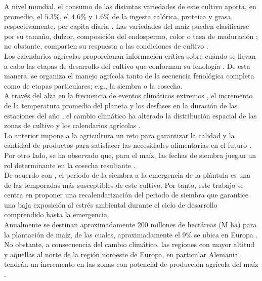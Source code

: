 A nivel mundial, el consumo de las distintas variedades de este cultivo aporta, en promedio, el $5.3\%$, el $4.6\%$ y $1.6\%$ de la ingesta calórica, proteica y grasa, respectivamente, per capita diaria \citep{Erenstein_2022}. Las variedades del maíz pueden clasificarse por su tamaño, dulzor, composición del endospermo, color o tasa de maduración \citep{Ranum_2014}; no obstante, comparten su respuesta a las condiciones de cultivo \citep{Baum_2019, Sanchez_2014, Parent_2012}.\\


Los calendarios agrícolas proporcionan información crítica sobre cuándo se llevan a cabo las etapas de desarrollo del cultivo que conforman su fenología \citep{Franch_2022}. De esta manera, se organiza el manejo agrícola tanto de la secuencia fenológica completa como de etapas particulares; e.g., la siembra o la cosecha.\\

A través del alza en la frecuencia de eventos climáticos extremos \citep{MIRON_2023}, el incremento de la temperatura promedio del planeta \citep{Shivanna_2022} y los desfases en la duración de las estaciones del año \citep{Wang_2014}, el cambio climático ha alterado la distribución espacial de las zonas de cultivo \citep{SU_2023} y los calendarios agrícolas \citep{Franch_2022}.\\


Lo anterior impone a la agricultura un reto para garantizar la calidad y la cantidad de productos para satisfacer las necesidades alimentarias en el futuro \citep{MIRON_2023}. Por otro lado, se ha observado que, para el maíz, las fechas de siembra juegan un rol determinante en la cosecha resultante \citep{Baum_2019, BernalMorales_2025, Long_2017, Mason_2018, Parker_2016, Sacks_2011}.\\


De acuerdo con \cite{Sanchez_2014}, el periodo de la siembra a la emergencia de la plántula es una de las temporadas más susceptibles de este cultivo. Por tanto, este trabajo se centra en proponer una recalendarización del periodo de siembra que garantice una baja exposición al estrés ambiental durante el ciclo de desarrollo comprendido hasta la emergencia.\\

Anualmente se destinan aproximadamente 200 millones de hectáreas (M ha) para la plantación de maíz, de las cuales, aproximadamente el 9\% se ubica en Europa \citep{Erenstein_2022}. No obstante, a consecuencia del cambio climático, las regiones con mayor altitud y aquellas al norte de la región noroeste de Europa, en particular Alemania, tendrán un incremento en las zonas con potencial de producción agrícola del maíz \citep{Miedaner_2021}.\\

